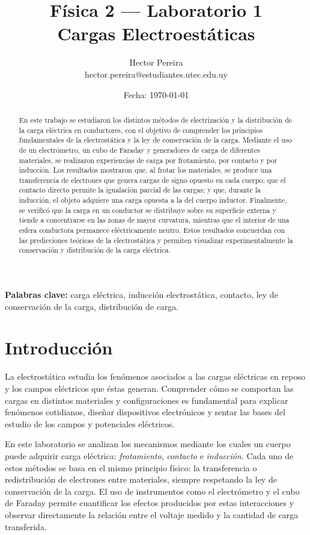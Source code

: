 \documentclass[12pt,a4paper]{article}
\title{\textbf{Física 2 --- Laboratorio 1}\\[0.2cm]
\large Cargas Electroestáticas}
\author{
Hector Pereira \\ hector.pereira@estudiantes.utec.edu.uy
}
\date{Fecha: \today}
\begin{document}
\maketitle
\thispagestyle{empty}
\vspace{1cm}

\begin{abstract}
En este trabajo se estudiaron los distintos métodos de electrización y la distribución de la carga eléctrica en conductores, con el objetivo de comprender los principios fundamentales de la electrostática y la ley de conservación de la carga. Mediante el uso de un electrómetro, un cubo de Faraday y generadores de carga de diferentes materiales, se realizaron experiencias de carga por frotamiento, por contacto y por inducción. Los resultados mostraron que, al frotar los materiales, se produce una transferencia de electrones que genera cargas de signo opuesto en cada cuerpo; que el contacto directo permite la igualación parcial de las cargas; y que, durante la inducción, el objeto adquiere una carga opuesta a la del cuerpo inductor. Finalmente, se verificó que la carga en un conductor se distribuye sobre su superficie externa y tiende a concentrarse en las zonas de mayor curvatura, mientras que el interior de una esfera conductora permanece eléctricamente neutro. Estos resultados concuerdan con las predicciones teóricas de la electrostática y permiten visualizar experimentalmente la conservación y distribución de la carga eléctrica.
\end{abstract}


\vspace{1cm}
\noindent\textbf{Palabras clave:} carga eléctrica, inducción electrostática, contacto, ley de conservación de la carga, distribución de carga.

\newpage

\section{Introducción}
La electrostática estudia los fenómenos asociados a las cargas eléctricas en reposo y los campos eléctricos que éstas generan. Comprender cómo se comportan las cargas en distintos materiales y configuraciones es fundamental para explicar fenómenos cotidianos, diseñar dispositivos electrónicos y sentar las bases del estudio de los campos y potenciales eléctricos.

En este laboratorio se analizan los mecanismos mediante los cuales un cuerpo puede adquirir carga eléctrica: \textit{frotamiento}, \textit{contacto} e \textit{inducción}. Cada uno de estos métodos se basa en el mismo principio físico: la transferencia o redistribución de electrones entre materiales, siempre respetando la ley de conservación de la carga. El uso de instrumentos como el electrómetro y el cubo de Faraday permite cuantificar los efectos producidos por estas interacciones y observar directamente la relación entre el voltaje medido y la cantidad de carga transferida.
\end{document}
